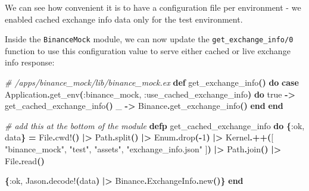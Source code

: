\documentclass[
  oneside]{book}
\newenvironment{Shaded}{\begin{snugshade}}{\end{snugshade}}
\newcommand{\CommentTok}[1]{\textcolor[rgb]{0.56,0.35,0.01}{\textit{#1}}}
\newcommand{\ConstantTok}[1]{\textcolor[rgb]{0.56,0.35,0.01}{#1}}
\newcommand{\DecValTok}[1]{\textcolor[rgb]{0.00,0.00,0.81}{#1}}
\newcommand{\FunctionTok}[1]{\textcolor[rgb]{0.13,0.29,0.53}{\textbf{#1}}}
\newcommand{\KeywordTok}[1]{\textcolor[rgb]{0.13,0.29,0.53}{\textbf{#1}}}
\newcommand{\NormalTok}[1]{#1}
\newcommand{\OperatorTok}[1]{\textcolor[rgb]{0.81,0.36,0.00}{\textbf{#1}}}
\newcommand{\OtherTok}[1]{\textcolor[rgb]{0.56,0.35,0.01}{#1}}
\newcommand{\StringTok}[1]{\textcolor[rgb]{0.31,0.60,0.02}{#1}}
\newcommand{\VariableTok}[1]{\textcolor[rgb]{0.00,0.00,0.00}{#1}}
\begin{document}
We can see how convenient it is to have a configuration file per environment - we enabled cached exchange info data only for the test environment.

Inside the \texttt{BinanceMock} module, we can now update the \texttt{get\_exchange\_info/0} function to use this configuration value to serve either cached or live exchange info response:

\begin{Shaded}
\begin{Highlighting}[]
  \CommentTok{\# /apps/binance\_mock/lib/binance\_mock.ex}
  \KeywordTok{def}\NormalTok{ get\_exchange\_info}\FunctionTok{()} \KeywordTok{do}
    \KeywordTok{case} \ConstantTok{Application}\OperatorTok{.}\NormalTok{get\_env}\FunctionTok{(}\VariableTok{:binance\_mock}\NormalTok{, }\VariableTok{:use\_cached\_exchange\_info}\FunctionTok{)} \KeywordTok{do}
      \ConstantTok{true} \OperatorTok{{-}\textgreater{}}\NormalTok{ get\_cached\_exchange\_info}\FunctionTok{()}
\NormalTok{      \_ }\OperatorTok{{-}\textgreater{}} \ConstantTok{Binance}\OperatorTok{.}\NormalTok{get\_exchange\_info}\FunctionTok{()}
    \KeywordTok{end}
  \KeywordTok{end}

  \CommentTok{\# add this at the bottom of the module}
  \KeywordTok{defp}\NormalTok{ get\_cached\_exchange\_info }\KeywordTok{do}
    \FunctionTok{\{}\VariableTok{:ok}\NormalTok{, data}\FunctionTok{\}} \OperatorTok{=}
      \ConstantTok{File}\OperatorTok{.}\NormalTok{cwd!}\FunctionTok{()}
      \OperatorTok{|\textgreater{}} \ConstantTok{Path}\OperatorTok{.}\NormalTok{split}\FunctionTok{()}
      \OperatorTok{|\textgreater{}} \ConstantTok{Enum}\OperatorTok{.}\NormalTok{drop}\FunctionTok{(}\OperatorTok{{-}}\DecValTok{1}\FunctionTok{)}
      \OperatorTok{|\textgreater{}} \ConstantTok{Kernel}\OperatorTok{.++}\FunctionTok{(}\OtherTok{[}
        \StringTok{"binance\_mock"}\NormalTok{,}
        \StringTok{"test"}\NormalTok{,}
        \StringTok{"assets"}\NormalTok{,}
        \StringTok{"exchange\_info.json"}
      \OtherTok{]}\FunctionTok{)}
      \OperatorTok{|\textgreater{}} \ConstantTok{Path}\OperatorTok{.}\NormalTok{join}\FunctionTok{()}
      \OperatorTok{|\textgreater{}} \ConstantTok{File}\OperatorTok{.}\NormalTok{read}\FunctionTok{()}

    \FunctionTok{\{}\VariableTok{:ok}\NormalTok{, }\ConstantTok{Jason}\OperatorTok{.}\NormalTok{decode!}\FunctionTok{(}\NormalTok{data}\FunctionTok{)} \OperatorTok{|\textgreater{}} \ConstantTok{Binance}\OperatorTok{.}\ConstantTok{ExchangeInfo}\OperatorTok{.}\NormalTok{new}\FunctionTok{()\}}
  \KeywordTok{end}
\end{Highlighting}
\end{Shaded}
\end{document}
